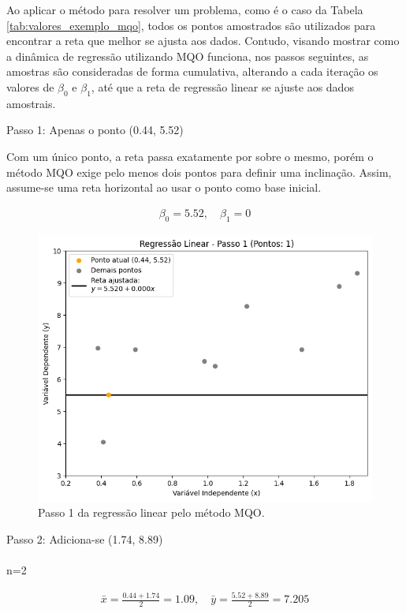 Ao aplicar o método para resolver um problema, como é o caso da Tabela \ref{tab:valores_exemplo_mqo}, todos os pontos amostrados são utilizados para encontrar a reta que melhor se ajusta aos dados. Contudo, visando mostrar como a dinâmica de regressão utilizando MQO funciona, nos passos seguintes, as amostras são consideradas de forma cumulativa, alterando a cada iteração os valores de $\beta_0$ e $\beta_1$, até que a reta de regressão linear se ajuste aos dados amostrais.

Passo 1: Apenas o ponto (0.44, 5.52)

Com um único ponto, a reta passa exatamente por sobre o mesmo, porém o método MQO exige pelo menos dois pontos para definir uma inclinação. Assim, assume-se uma reta horizontal ao usar o ponto como base inicial.

\begin{gather*}
	\beta_0 = 5.52, \quad \beta_1 = 0
\end{gather*}


\begin{figure}[H]
	\caption{\label{fig:mqo_1}Passo 1 da regressão linear pelo método MQO.}
	\begin{center}
		\includegraphics[scale=0.5]{figuras/RL_step_1.png}
	\end{center}
\end{figure}

Passo 2: Adiciona-se (1.74, 8.89)
\\ \\
n=2

\begin{gather*}
	\bar{x} = \frac{0.44 + 1.74}{2} = 1.09, \quad \bar{y} = \frac{5.52 + 8.89}{2} = 7.205
\end{gather*}


